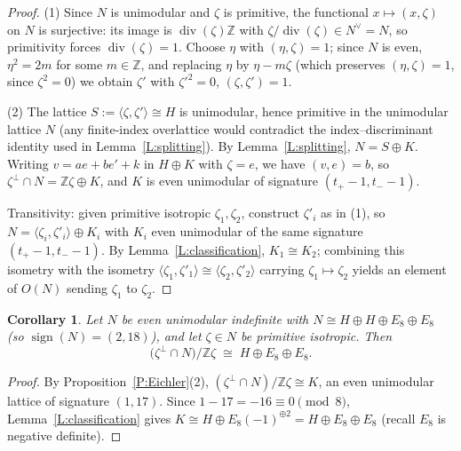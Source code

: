 \documentclass[11pt]{amsart}
\theoremstyle{plain}
\newtheorem{corollary}[theorem]{Corollary}
\theoremstyle{definition}
\theoremstyle{remark}
\numberwithin{equation}{section}
\begin{document}
\begin{proof}
(1) Since \(N\) is unimodular and \(\zeta\) is primitive, the functional
\(x\mapsto(x,\zeta)\) on \(N\) is surjective: its image is
\(\operatorname{div}(\zeta)\mathbb Z\) with
\(\zeta/\operatorname{div}(\zeta)\in N^{\vee}=N\), so primitivity forces
\(\operatorname{div}(\zeta)=1\). Choose \(\eta\) with
\((\eta,\zeta)=1\); since \(N\) is even, \(\eta^{2}=2m\) for some
\(m\in\mathbb Z\), and replacing \(\eta\) by
\(\eta-m\zeta\) (which preserves \((\eta,\zeta)=1\), since
\(\zeta^{2}=0\)) we obtain \(\zeta'\) with \(\zeta'^{2}=0\),
\((\zeta,\zeta')=1\).

(2) The lattice \(S:=\langle\zeta,\zeta'\rangle\cong H\) is unimodular,
hence primitive in the unimodular lattice \(N\) (any finite-index
overlattice would contradict the index--discriminant identity used in
Lemma~\ref{L:splitting}). By Lemma~\ref{L:splitting},
\(N=S\oplus K\). Writing
\(v=ae+b e'+k\) in \(H\oplus K\) with \(\zeta=e\), we have
\((v,e)=b\), so \(\zeta^{\perp}\cap N=\mathbb Z\zeta\oplus K\), and
\(K\) is even unimodular of signature \((t_{+}-1,t_{-}-1)\).

Transitivity: given primitive isotropic \(\zeta_{1},\zeta_{2}\), construct
\(\zeta'_{i}\) as in (1), so \(N=\langle\zeta_{i},\zeta'_{i}\rangle\oplus
K_{i}\) with \(K_{i}\) even unimodular of the same signature
\((t_{+}-1,t_{-}-1)\). By Lemma~\ref{L:classification}, \(K_{1}\cong K_{2}\);
combining this isometry with the isometry
\(\langle\zeta_{1},\zeta'_{1}\rangle\cong\langle\zeta_{2},\zeta'_{2}\rangle\)
carrying \(\zeta_{1}\mapsto\zeta_{2}\) yields an element of \(O(N)\)
sending \(\zeta_{1}\) to \(\zeta_{2}\).
\end{proof}

\begin{corollary}\label{C:quotient}
Let \(N\) be even unimodular indefinite with
\(N\cong H\oplus H\oplus E_{8}\oplus E_{8}\) (so
\(\operatorname{sign}(N)=(2,18)\)), and let \(\zeta\in N\) be primitive
isotropic. Then
\[
\bigl(\zeta^{\perp}\cap N\bigr)\big/\mathbb Z\zeta
\;\cong\; H\oplus E_{8}\oplus E_{8}.
\]
\end{corollary}

\begin{proof}
By Proposition~\ref{P:Eichler}(2),
\((\zeta^{\perp}\cap N)/\mathbb Z\zeta\cong K\), an even unimodular lattice
of signature \((1,17)\). Since \(1-17=-16\equiv0\pmod 8\),
Lemma~\ref{L:classification} gives
\(K\cong H\oplus E_{8}(-1)^{\oplus2}=H\oplus E_{8}\oplus E_{8}\)
(recall \(E_{8}\) is negative definite).
\end{proof}
\end{document}
